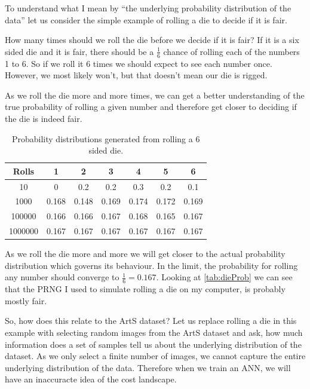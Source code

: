 To understand what I mean by ``the underlying probability distribution of the data'' let us consider the simple example of rolling a die to decide if it is fair.

How many times should we roll the die before we decide if it is fair? If it is a six sided die and it is fair, there should be a $\frac{1}{6}$ chance of rolling each of the numbers 1 to 6. So if we roll it 6 times we should expect to see each number once. However, we most likely won't, but that doesn't mean our die is rigged.

As we roll the die more and more times, we can get a better understanding of the true probability of rolling a given number and therefore get closer to deciding if the die is indeed fair.

\begin{table}[h]
\centering
	\begin{tabular}{|c|c|c|c|c|c|c|}
	\hline
	\textbf{Rolls} & \textbf{1} & \textbf{2} & \textbf{3} & \textbf{4} & \textbf{5} & \textbf{6} \\ \hline
	10 & 0 & 0.2 & 0.2 & 0.3 & 0.2 & 0.1 \\ \hline
	1000 & 0.168 & 0.148 & 0.169 & 0.174 & 0.172 & 0.169  \\ \hline
	100000 & 0.166 & 0.166 & 0.167 & 0.168 & 0.165 & 0.167  \\ \hline
	1000000 & 0.167 & 0.167 & 0.167 & 0.167 & 0.167 & 0.167  \\ \hline
	\end{tabular}
	\caption{Probability distributions generated from rolling a 6 sided die.}
	\label{tab:dieProb}
\end{table}

As we roll the die more and more we will get closer to the actual probability distribution which governs its behaviour. In the limit, the probability for rolling any number should converge to $\frac{1}{6} = 0.167$. Looking at \autoref{tab:dieProb} we can see that the \ac{PRNG} I used to simulate rolling a die on my computer, is probably mostly fair. 

So, how does this relate to the ArtS dataset? Let us replace rolling a die in this example with selecting random images from the ArtS dataset and ask, how much information does a set of samples tell us about the underlying distribution of the dataset. As we only select a finite number of images, we cannot capture the entire underlying distribution of the data. Therefore when we train an \ac{ANN}, we will have an inaccuracte idea of the cost landscape.

